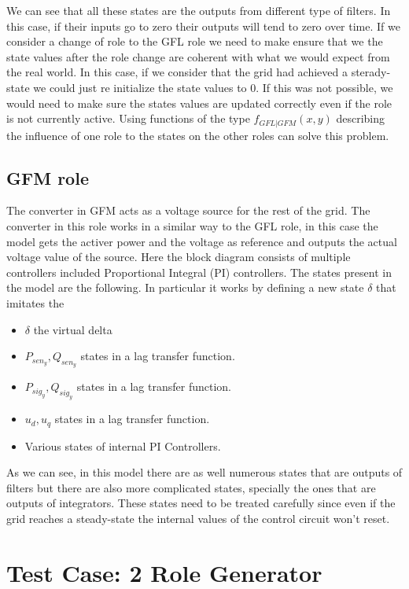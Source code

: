 We can see that all these states are the outputs from different type of filters. In this case, if their inputs go to zero their outputs will tend to zero over time. If we consider a change of role to the GFL role we need to make ensure that we the state values after the role change are coherent with what we would expect from the real world. In this case, if we consider that the grid had achieved a sterady-state we could just re initialize the state values to $0$. If this was not possible, we would need to make sure the states values are updated correctly even if the role is not currently active. Using functions of the type $f_{GFL|GFM}(x,y)$ describing the influence of one role to the states on the other roles can solve this problem.\\ 
\subsection{GFM role}

The converter in GFM acts as a voltage source for the rest of the grid. The converter in this role works in a similar way to the GFL role, in this case the model gets the activer power and the voltage as reference and outputs the actual voltage value of the source. Here the block diagram consists of multiple controllers included Proportional Integral (PI) controllers. The states present in the model are the following. In particular it works by defining a new state $\delta$ that imitates the 

\begin{itemize}
    \item $\delta$ the virtual delta 
    \item $P_{sen_y}, Q_{sen_y}$ states in a lag transfer function.
    \item $P_{sig_y}, Q_{sig_y}$ states in a lag transfer function. 
    \item $u_d, u_q$ states in a lag transfer function. 
    \item Various states of internal PI Controllers.
\end{itemize}

As we can see, in this model there are as well numerous states that are outputs of filters but there are also more complicated states, specially the ones that are outputs of integrators. These states need to be treated carefully since even if the grid reaches a steady-state the internal values of the control circuit won't reset. 


\section[short]{Test Case: 2 Role Generator}

